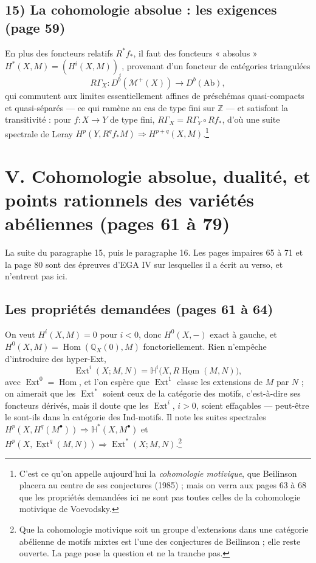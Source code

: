 \documentclass[11pt,a4paper]{article}
\begin{document}
\subsection*{15) La cohomologie absolue : les exigences (page 59)}

En plus des foncteurs relatifs $R^{*}f_{*}$, il faut des foncteurs « absolus »
$H^{*}(X, M) = (H^{i}(X, M))_{i}$, provenant d'un foncteur de catégories triangulées
\[
R\Gamma_{X} \colon D^{b}(\mathcal{M}^{+}(X)) \longrightarrow D^{b}(\mathrm{Ab}) ,
\]
qui commutent aux limites essentiellement affines de préschémas quasi-compacts
et quasi-séparés --- ce qui ramène au cas de type fini sur $\mathbb{Z}$ --- et
satisfont la transitivité : pour $f \colon X \to Y$ de type fini, $R\Gamma_{X} =
R\Gamma_{Y} \circ Rf_{*}$, d'où une suite spectrale de Leray
$H^{p}(Y, R^{q}f_{*}M) \Rightarrow H^{p+q}(X, M)$.\footnote{C'est ce qu'on appelle
aujourd'hui la \emph{cohomologie motivique}, que Beilinson placera au centre de
ses conjectures (1985) ; mais on verra aux pages 63 à 68 que les propriétés
demandées ici ne sont pas toutes celles de la cohomologie motivique de
Voevodsky.}

\section*{V. Cohomologie absolue, dualité, et points rationnels des variétés abéliennes (pages 61 à 79)}

La suite du paragraphe 15, puis le paragraphe 16. Les pages impaires 65 à 71 et
la page 80 sont des épreuves d'EGA IV sur lesquelles il a écrit au verso, et
n'entrent pas ici.

\subsection*{Les propriétés demandées (pages 61 à 64)}

On veut $H^{i}(X, M) = 0$ pour $i < 0$, donc $H^{0}(X, -)$ exact à gauche, et
$H^{0}(X, M) = \operatorname{Hom}(\mathbb{Q}_{X}(0), M)$ fonctoriellement. Rien n'empêche d'introduire des hyper-Ext,
\[
\operatorname{Ext}^{i}(X ; M, N) = \mathbb{H}^{i}\bigl(X,
R\underline{\operatorname{Hom}}(M, N)\bigr) ,
\]
avec $\operatorname{Ext}^{0} = \operatorname{Hom}$, et l'on espère que
$\operatorname{Ext}^{1}$ classe les extensions de $M$ par $N$ ; on aimerait que
les $\operatorname{Ext}^{*}$ soient ceux de la catégorie des motifs, c'est-à-dire
ses foncteurs dérivés, mais il doute que les $\operatorname{Ext}^{i}$, $i > 0$,
soient effaçables --- peut-être le sont-ils dans la catégorie des Ind-motifs. Il
note les suites spectrales $H^{p}(X, H^{q}(M^{\bullet})) \Rightarrow
\mathbb{H}^{*}(X, M^{\bullet})$ et $H^{p}(X, \underline{\operatorname{Ext}}^{q}(M,N))
\Rightarrow \operatorname{Ext}^{*}(X ; M, N)$.\footnote{Que la cohomologie
motivique soit un groupe d'extensions dans une catégorie abélienne de motifs
mixtes est l'une des conjectures de Beilinson ; elle reste ouverte. La page pose
la question et ne la tranche pas.}
\end{document}
